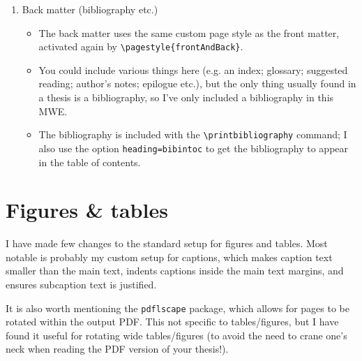 \begin{enumerate}
\begin{itemize}
        \item Again, I have defined a custom page style for the main matter, activated by the command \verb!\pagestyle{main}! (note that this style also makes use of the ``plain'' page style for e.g. Chapter title-pages; the ``plain'' style is [re-]defined in the same location as the other styles).
        \item Chapters are included via the \verb!! command.
        \item Note that if you are working on a single chapter and want to quickly compile just that chapter to see the effect of your changes, you can add the command \verb!! to your preamble.
        \item Appendices are normal Chapters wrapped in their own environment: \verb!\begin{appendices}...\end{appendices}!.
    \end{itemize}
    \item Back matter (bibliography etc.)
    \begin{itemize}
        \item The back matter uses the same custom page style as the front matter, activated again by \verb!\pagestyle{frontAndBack}!.
        \item You could include various things here (e.g. an index; glossary; suggested reading; author's notes; epilogue etc.), but the only thing usually found in a thesis is a bibliography, so I've only included a bibliography in this MWE.
        \item The bibliography is included with the \verb!\printbibliography! command; I also use the option \verb!heading=bibintoc! to get the bibliography to appear in the table of contents.
    \end{itemize}
\end{enumerate}

\section{Figures \& tables}
I have made few changes to the standard setup for figures and tables.
Most notable is probably my custom setup for captions, which makes caption text smaller than the main text, indents captions inside the main text margins, and ensures subcaption text is justified.

It is also worth mentioning the \verb!pdflscape! package, which allows for pages to be rotated within the output PDF.
This not specific to tables/figures, but I have found it useful for rotating wide tables/figures (to avoid the need to crane one's neck when reading the PDF version of your thesis!).

